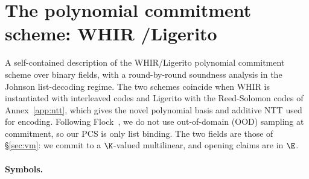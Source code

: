 \section{The polynomial commitment scheme: WHIR \slash Ligerito}\label{annex:pcs}

A self-contained description of the WHIR\slash Ligerito polynomial commitment scheme \cite{ACFY25,NA25} over binary fields, with a round-by-round soundness analysis in the Johnson list-decoding regime. The two schemes coincide when WHIR is instantiated with interleaved codes and Ligerito with the Reed-Solomon codes of Annex~\ref{app:ntt}, which gives the novel polynomial basis and additive NTT used for encoding. Following Flock~\cite{Flock26}, we do not use out-of-domain (OOD) sampling at commitment, so our PCS is only list binding. The two fields are those of \S\ref{sec:vm}: we commit to a $\K$-valued multilinear, and opening claims are in $\E$.

\paragraph{Symbols.}

